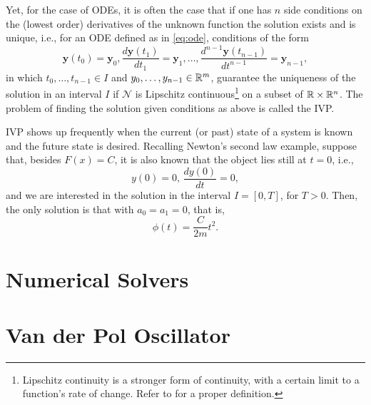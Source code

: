 Yet, for the case of ODEs, it is often the case that if one has $n$ side conditions on the (lowest order) derivatives of the unknown function the solution exists and is unique, i.e., for an ODE defined as in \eqref{eq:ode}, conditions of the form \[
\bm{y}\left( t_0 \right) =\bm{y}_0,\frac{d\bm{y}\left( t_1 \right) }{dt_1}=\bm{y}_1,\ldots,\frac{d^{n-1}\bm{y}\left( t_{n-1} \right) }{dt^{n-1}}= \bm{y}_{n-1}
,\] in which $t_0,\ldots,t_{n-1}\in I$ and $y_0,\ldots,y_{n-1}\in \mathbb{R}^m$, guarantee the uniqueness of the solution in an interval $I$ if $\mathcal{N}$ is Lipschitz continuous\footnote{Lipschitz continuity is a stronger form of continuity, with a certain limit to a function's rate of change. Refer to \textcite{sohrab_basic_2003} for a proper definition.} on a subset of $\mathbb{R}\times \mathbb{R}^{n}$\footnotemark. \cite{coddington_theory_2012}
The problem of finding the solution given conditions as above is called the \gls{IVP}.

\gls{IVP} shows up frequently when the current (or past) state of a system is known and the future state is desired. Recalling Newton's second law example, suppose that, besides $F(x)=C$, it is also known that the object lies still at $t=0$, i.e., \[
y(0) = 0,\,\frac{d y(0)}{dt}=0
,\] and we are interested in the solution in the interval $I=\left[ 0,T \right] $, for $T>0$. Then, the only solution is that with $a_0=a_1=0$, that is, \[
    \phi\left( t \right) = \frac{C}{2m}t^2
.\] 

\section{Numerical Solvers}

\section{Van der Pol Oscillator}
